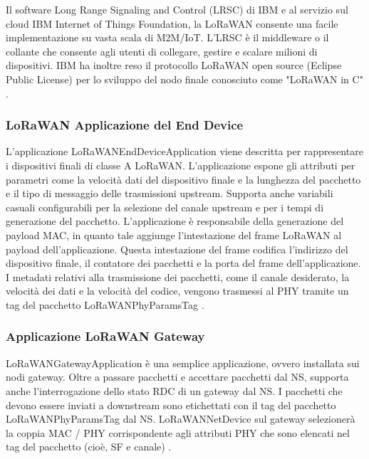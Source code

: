\documentclass[a4paper]{report} %
\begin{document}
Il software Long Range Signaling and Control (LRSC) di IBM e al servizio sul cloud IBM Internet of Things Foundation, la LoRaWAN consente una facile implementazione su vasta scala di M2M/IoT. L'LRSC è il middleware o il collante che consente agli utenti di collegare, gestire e scalare milioni di dispositivi. IBM ha inoltre reso il protocollo LoRaWAN open source (Eclipse Public License) per lo sviluppo del nodo finale conosciuto come "LoRaWAN in C" \cite{art:rif.26}.



\subsubsection{LoRaWAN Applicazione del End Device}
L'applicazione LoRaWANEndDeviceApplication viene descritta per rappresentare i dispositivi finali di classe A LoRaWAN. L'applicazione espone gli attributi per parametri come la velocità dati del dispositivo finale e la lunghezza del pacchetto e il tipo di messaggio delle trasmissioni upstream. Supporta anche variabili casuali configurabili per la selezione del canale upstream e per i tempi di generazione del pacchetto. L'applicazione è responsabile della generazione del payload MAC, in quanto tale aggiunge l'intestazione del frame LoRaWAN al payload dell'applicazione. Questa intestazione del frame codifica l'indirizzo del dispositivo finale, il contatore dei pacchetti e la porta del frame dell'applicazione. I metadati relativi alla trasmissione dei pacchetti, come il canale desiderato, la velocità dei dati e la velocità del codice, vengono trasmessi al PHY tramite un tag del pacchetto LoRaWANPhyParamsTag \cite{art:rif.49}.

\subsubsection{Applicazione LoRaWAN Gateway}
LoRaWANGatewayApplication è una semplice applicazione, ovvero installata sui nodi gateway. Oltre a passare pacchetti e accettare pacchetti dal NS, supporta anche l'interrogazione dello stato RDC di un gateway dal NS. I pacchetti che devono essere inviati a downstream sono etichettati con il tag del pacchetto LoRaWANPhyParamsTag dal NS. LoRaWANNetDevice sul gateway selezionerà la coppia MAC / PHY corrispondente agli attributi PHY che sono elencati nel tag del pacchetto (cioè, SF e canale) \cite{art:rif.49}.
\end{document}
